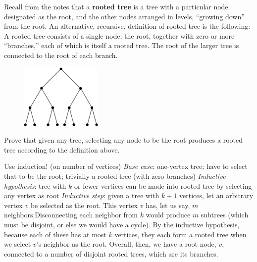 \question Recall from the notes that a \textbf{rooted tree} is a tree 
with a particular node designated as the root, and the other nodes 
arranged in levels, “growing down” from the root. An alternative, 
recursive, definition of rooted tree is the following:  A rooted tree 
consists of a single node, the root, together with zero or more 
“branches,” each of which is itself a rooted tree. The root of the 
larger tree is connected to the root of each branch. \newline
\begin{figure}[h]
\includegraphics{rooted_tree}
\centering
\end{figure}\newline
Prove that given any tree, selecting any node to be the root produces 
a rooted tree according to the definition above.

\begin{solution}[2in]
Use induction! (on number of vertices)\newline
\textit{Base case}: one-vertex tree; have to select that to be the 
root; trivially a rooted tree (with zero branches)\newline
\textit{Inductive hypothesis}: tree with $k$ or fewer vertices can 
be made into rooted tree by selecting any vertex as root\newline
\textit{Inductive step}: given a tree with $k + 1$ vertices, let an 
arbitrary vertex $v$ be selected as the root. This vertex $v$ has, 
let us say, $m$ neighbors.\newline Disconnecting each neighbor from 
$k$ would produce $m$ subtrees (which must be disjoint, or else we 
would have a cycle). By the inductive hypothesis, because each of 
these has at most $k$ vertices, they each form a rooted tree when we 
select $v$’s neighbor as the root. Overall, then, we have a root node, 
$v$, connected to a number of disjoint rooted trees, which are its 
branches.
\end{solution}